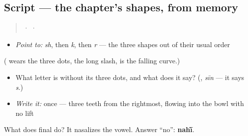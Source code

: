 \subsection*{Script — the chapter's shapes, from memory}
\begin{quote}
 ·  · 
\end{quote}

\begin{itemize}
\raggedright
  \item \emph{Point to:} \emph{sh}, then \emph{k}, then \emph{r} — the three shapes out of their usual order
\end{itemize}

(\textbf{} wears the three dots, \textbf{} the long slash, \textbf{} is the falling curve.)

\begin{itemize}
\raggedright
  \item What letter is \textbf{} without its three dots, and what does it say? (\textbf{}, \emph{sīn} — it says \emph{s}.)
  \item \emph{Write it:} \textbf{} once — three teeth from the rightmost, flowing into the bowl with no lift
\end{itemize}

\begin{tcolorbox}[breakable,colback=teal!4,colframe=teal!35!black,title={Before you move on}]
What does final \textbf{} do? It nasalizes the vowel. Answer “no”: \textbf{nahī̃}.
\end{tcolorbox}
